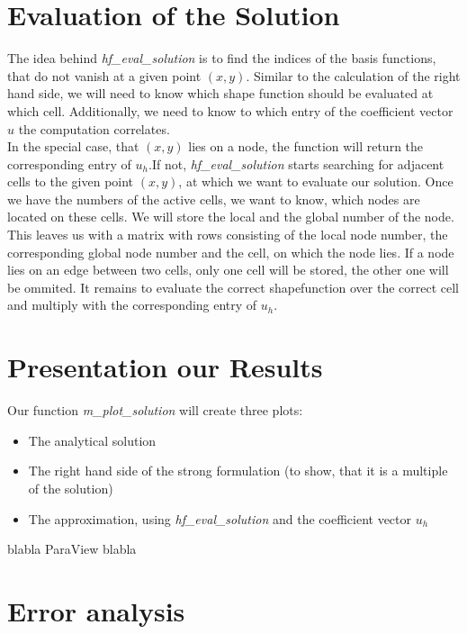 \documentclass[a4paper,12pt]{article}
\begin{document}
\section{Evaluation of the Solution}
The idea behind \textit{hf\_eval\_solution} is to find the indices of the basis functions, that do not vanish at a given point $(x,y)$. Similar to the calculation of the right hand side, we will need to know which shape function should be evaluated at which cell. Additionally, we need to know to which entry of the coefficient vector $u$ the computation correlates.\\
In the special case, that $(x,y)$ lies on a node, the function will return the corresponding entry of $u_h$.If not, \textit{hf\_eval\_solution} starts searching for adjacent cells to the given point $(x,y)$, at which we want to evaluate our solution. Once we have the numbers of the active cells, we want to know, which nodes are located on these cells. We will store the local and the global number of the node. This leaves us with a matrix with rows consisting of the local node number, the corresponding global node number and the cell, on which the node lies. If a node lies on an edge between two cells, only one cell will be stored, the other one will be ommited. It remains to evaluate the correct shapefunction over the correct cell and multiply with the corresponding entry of $u_h$.

\section{Presentation our Results}
Our function \textit{m\_plot\_solution} will create three plots:
\begin{itemize}
\item The analytical solution
\item The right hand side of the strong formulation (to show, that it is a multiple of the solution)
\item The approximation, using \textit{hf\_eval\_solution} and the coefficient vector $u_h$
\end{itemize}

blabla ParaView blabla

\section{Error analysis}
\end{document}
